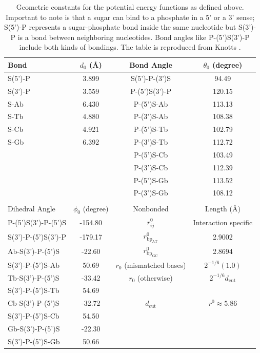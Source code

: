 \begin{table}[htb]
\begin{tabular}{lccc}
\hline
Bond&$d_0$ (\AA)&Bond Angle& $\theta_0$ (degree) \\
\hline
S(5')-P & 3.899 & S(5')-P-(3')S & 94.49\\
S(3')-P & 3.559 & P-(5')S(3')-P & 120.15 \\
S-Ab & 6.430 & P-(5')S-Ab & 113.13\\
S-Tb & 4.880 & P-(3')S-Ab & 108.38\\
S-Cb & 4.921 & P-(5')S-Tb & 102.79\\
S-Gb & 6.392 & P-(3')S-Tb & 112.72\\
&&P-(5')S-Cb & 103.49\\
&& P-(3')S-Cb & 112.39\\
&& P-(5')S-Gb & 113.52\\
&& P-(3')S-Gb & 108.12\\
& & & \\
\hline
Dihedral Angle & $\phi_0$ (degree) & Nonbonded & Length (\AA) \\
\hline
P-(5')S(3')-P-(5')S & -154.80 & $r^0_{ij}$ & Interaction specific \\
S(3')-P-(5')S(3')-P & -179.17 & $r^0_{\text{bp}_\text{AT}}$ & 2.9002 \\
Ab-S(3')-P-(5')S & -22.60 & $r^0_{\text{bp}_\text{GC}}$ & 2.8694 \\
S(3')-P-(5')S-Ab & 50.69 & $r_0$ (mismatched bases) & $2^{-1/6} (1.0)$ \\
Tb-S(3')-P-(5')S & -33.42 & $r_0$ (otherwise) & $2^{-1/6} d_\text{cut}$ \\
S(3')-P-(5')S-Tb & 54.69 & & \\
Cb-S(3')-P-(5')S & -32.72 & $d_\text{cut}$ & $r^0 \approx 5.86$ \\
S(3')-P-(5')S-Cb	& 54.50 & & \\
Gb-S(3')-P-(5')S & -22.30 & & \\
S(3')-P-(5')S-Gb & 50.66 & & \\
\hline
\end{tabular}\label{geometricConstants}

\caption{Geometric constants for the potential energy functions as defined above. Important to note is that a sugar can bind to a phosphate in a 5' or a 3' sense; S(5')-P represents a sugar-phosphate bond inside the same nucleotide but S(3')-P is a bond between neighboring nucleotides. Bond angles like P-(5')S(3')-P include both kinds of bondings. The table is reproduced from Knotts \etal \cite{knotts2007coarse}.}
\end{table}


